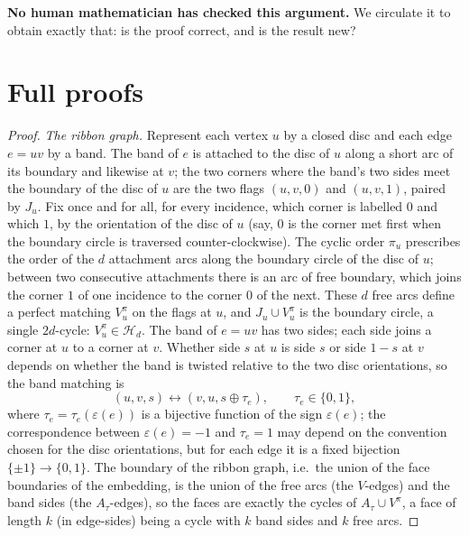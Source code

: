 \documentclass[11pt,a4paper]{article}
\theoremstyle{plain}
\theoremstyle{definition}
\theoremstyle{remark}
\newcommand{\cH}{\mathcal H}
\begin{document}
\textbf{No human mathematician has checked this argument.} We circulate it to obtain exactly that: is the proof correct, and is the result new?

\appendix

\section{Full proofs}\label{app:proofs}

\label{pf:model}
\lemmodel*
\begin{proof}
\emph{The ribbon graph.} Represent each vertex $u$ by a closed disc and each edge $e=uv$ by a band. The band of $e$ is attached to the disc of $u$ along a short arc of its boundary and likewise at $v$; the two corners where the band's two sides meet the boundary of the disc of $u$ are the two flags $(u,v,0)$ and $(u,v,1)$, paired by $J_u$. Fix once and for all, for every incidence, which corner is labelled $0$ and which $1$, by the orientation of the disc of $u$ (say, $0$ is the corner met first when the boundary circle is traversed counter-clockwise). The cyclic order $\pi_u$ prescribes the order of the $d$ attachment arcs along the boundary circle of the disc of $u$; between two consecutive attachments there is an arc of free boundary, which joins the corner $1$ of one incidence to the corner $0$ of the next. These $d$ free arcs define a perfect matching $V^{\pi}_u$ on the flags at $u$, and $J_u\cup V^{\pi}_u$ is the boundary circle, a single $2d$-cycle: $V^\pi_u\in\cH_d$. The band of $e=uv$ has two sides; each side joins a corner at $u$ to a corner at $v$. Whether side $s$ at $u$ is side $s$ or side $1-s$ at $v$ depends on whether the band is twisted relative to the two disc orientations, so the band matching is
\[
(u,v,s)\longleftrightarrow(v,u,s\oplus\tau_e),\qquad\tau_e\in\{0,1\},
\]
where $\tau_e=\tau_e(\varepsilon(e))$ is a bijective function of the sign $\varepsilon(e)$; the correspondence between $\varepsilon(e)=-1$ and $\tau_e=1$ may depend on the convention chosen for the disc orientations, but for each edge it is a fixed bijection $\{\pm1\}\to\{0,1\}$. The boundary of the ribbon graph, i.e.\ the union of the face boundaries of the embedding, is the union of the free arcs (the $V$-edges) and the band sides (the $A_\tau$-edges), so the faces are exactly the cycles of $A_\tau\cup V^\pi$, a face of length $k$ (in edge-sides) being a cycle with $k$ band sides and $k$ free arcs.


\end{proof}
\end{document}
